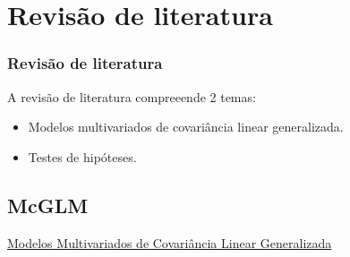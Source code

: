 \documentclass[10pt,
  aspectratio=169,
  serif,
  mathserif,
  professionalfont,
  compress,
  handout,
  ]{beamer}\usepackage[]{graphicx}\usepackage[]{color}
\begin{document}
\section{Revisão de literatura}


\begin{frame}
  \frametitle{Revisão de literatura}
  
  A revisão de literatura compreeende 2 temas:
  
  \begin{itemize}
    \itemsep 2ex
  \item Modelos multivariados de covariância linear generalizada. 
  \item Testes de hipóteses. 
  \end{itemize}
\end{frame}


\subsection{McGLM}


\begin{frame}[c, allowframebreaks]

\begin{center}

  {\normalsize \href{https://lineu96.github.io/st/}{Modelos Multivariados de Covariância Linear Generalizada}}
  
\end{center}

\end{frame}

\end{document}
